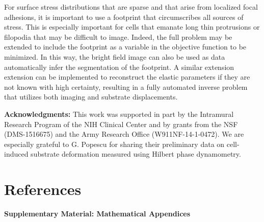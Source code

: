 \documentclass[aps,prl,reprint,groupedaddress,twocolumn]{revtex4-1}
\begin{document}
For surface stress distributions that are sparse and that arise from
localized focal adhesions, it is  important to use a
footprint that circumscribes all sources of stress. This is especially
important for cells that emanate long thin protrusions or filopodia
that may be difficult to image. Indeed, the full problem may be
extended to include the footprint as a variable in the objective
function to be minimized.  In this way, the bright field image can
also be used as data automatically infer the segmentation of the
footprint. A similar extension extension can be implemented to
reconstruct the elastic parameters if they are not known with high
certainty, resulting in a fully automated inverse problem that
utilizes both imaging and substrate displacements.



\vspace{3mm}
\noindent \textbf{Acknowledgments:} This work was supported in part
by the Intramural Research Program of the NIH Clinical Center and by grants from the
NSF (DMS-1516675) and the Army Research Office (W911NF-14-1-0472). We
are especially grateful to G. Popescu for sharing their preliminary
data on cell-induced substrate deformation measured using Hilbert
phase dynamometry.  

%


\section{References}




\onecolumngrid

\clearpage
\newpage
\setcounter{page}{1}
\begin{large}
\textbf{Supplementary Material: Mathematical Appendices}
\end{large}
\end{document}
